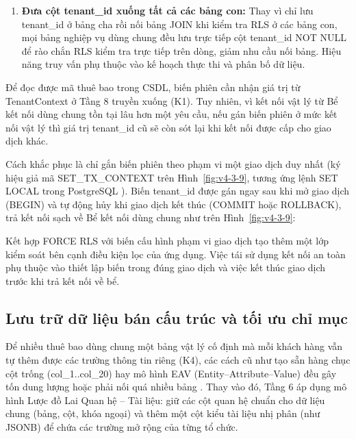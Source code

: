 \begin{enumerate}
\def\labelenumi{\arabic{enumi}.}
\setcounter{enumi}{3}
\tightlist
\item
  \textbf{Đưa cột tenant\_\allowbreak{}id xuống tất cả các bảng con:} Thay vì chỉ lưu tenant\_\allowbreak{}id ở bảng cha rồi nối bảng JOIN khi kiểm tra RLS ở các bảng con, mọi bảng nghiệp vụ dùng chung đều lưu trực tiếp cột tenant\_\allowbreak{}id NOT NULL để rào chắn RLS kiểm tra trực tiếp trên dòng, giảm nhu cầu nối bảng. Hiệu năng truy vấn phụ thuộc vào kế hoạch thực thi và phân bố dữ liệu.
\end{enumerate}

Để đọc được mã thuê bao trong CSDL, biến phiên cần nhận giá trị từ TenantContext ở Tầng 8 truyền xuống (K1). Tuy nhiên, vì kết nối vật lý từ Bể kết nối dùng chung tồn tại lâu hơn một yêu cầu, nếu gán biến phiên ở mức kết nối vật lý thì giá trị tenant\_\allowbreak{}id cũ sẽ còn sót lại khi kết nối được cấp cho giao dịch khác.

Cách khắc phục là chỉ gắn biến phiên theo phạm vi một giao dịch duy nhất (ký hiệu giả mã SET\_\allowbreak{}TX\_\allowbreak{}CONTEXT trên Hình~\ref{fig:v4-3-9}, tương ứng lệnh SET LOCAL trong PostgreSQL \cite{v4-22}). Biến tenant\_\allowbreak{}id được gán ngay sau khi mở giao dịch (BEGIN) và tự động hủy khi giao dịch kết thúc (COMMIT hoặc ROLLBACK), trả kết nối sạch về Bể kết nối dùng chung như trên Hình~\ref{fig:v4-3-9}:


Kết hợp FORCE RLS với biến cấu hình phạm vi giao dịch tạo thêm một lớp kiểm soát bên cạnh điều kiện lọc của ứng dụng. Việc tái sử dụng kết nối an toàn phụ thuộc vào thiết lập biến trong đúng giao dịch và việc kết thúc giao dịch trước khi trả kết nối về bể.

\subsection{Lưu trữ dữ liệu bán cấu trúc và tối ưu chỉ mục}\label{v4-sec-3-4-2}

Để nhiều thuê bao dùng chung một bảng vật lý cố định mà mỗi khách hàng vẫn tự thêm được các trường thông tin riêng (K4), các cách cũ như tạo sẵn hàng chục cột trống (col\_\allowbreak{}1..col\_\allowbreak{}20) hay mô hình EAV (Entity--Attribute--Value) đều gây tốn dung lượng hoặc phải nối quá nhiều bảng \cite{v4-21}. Thay vào đó, Tầng 6 áp dụng mô hình Lược đồ Lai Quan hệ -- Tài liệu: giữ các cột quan hệ chuẩn cho dữ liệu chung (bảng, cột, khóa ngoại) và thêm một cột kiểu tài liệu nhị phân (như JSONB) để chứa các trường mở rộng của từng tổ chức.

